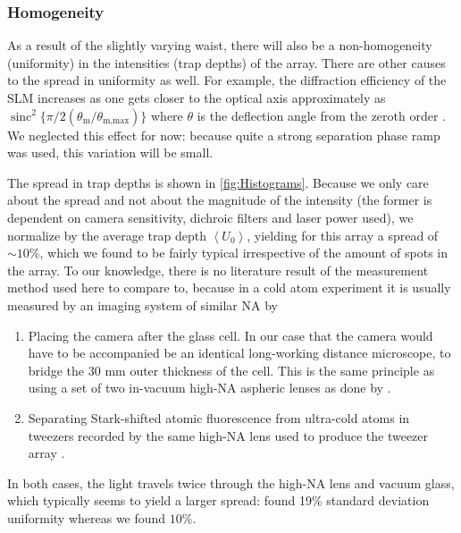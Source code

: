 \subsubsection*{Homogeneity}

As a result of the slightly varying waist, there will also be a non-homogeneity (uniformity) in the intensities (trap depths) of the array.
There are other causes to the spread in uniformity as well.
For example, the diffraction efficiency of the SLM increases as one gets closer to the optical axis approximately as $\operatorname{sinc}^2\{
\pi/2 (\theta_{\text{m}}/\theta_{\text{m,max}})\}$ where $\theta$ is the deflection angle from the zeroth order \cite{Ebadi2021}.
We neglected this effect for now: because quite a strong separation phase ramp was used, this variation will be small.

The spread in trap depths is shown in \cref{fig:Histograms}.
Because we only care about the spread and not about the magnitude of the intensity (the former is dependent on camera sensitivity, dichroic filters and laser power used), we normalize by the average trap depth $\left\langle U_0 \right\rangle$, yielding for this array a spread of $\sim 10$\%, which we found to be fairly typical irrespective of the amount of spots in the array.
To our knowledge, there is no literature result of the measurement method used here to compare to, because in a cold atom experiment it is usually measured by an imaging system of similar \ac{NA} by

\begin{enumerate}
    \item Placing the camera after the glass cell. 
    In our case that the camera would have to be accompanied be an identical long-working distance microscope, to bridge the 30 mm outer thickness of the cell.
    This is the same principle as using a set of two in-vacuum high-NA aspheric lenses as done by \cite{Nogrette2014}.
    
    \item Separating Stark-shifted atomic fluorescence from ultra-cold atoms in tweezers recorded by the same high-NA lens used to produce the tweezer array \cite{Ebadi2021}.
\end{enumerate}
In both cases, the light travels twice through the high-NA lens and vacuum glass, which typically seems to yield a larger spread: \cite{Nogrette2014} found 19\% standard deviation uniformity whereas we found $10\%$.

